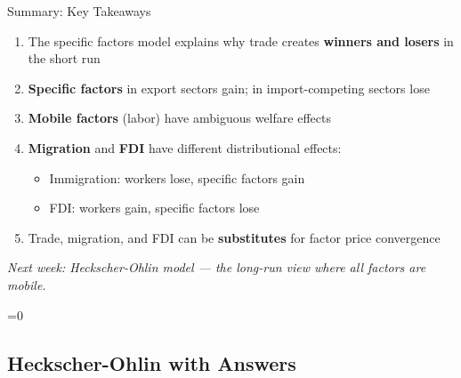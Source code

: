 \documentclass{beamer}
\newcommand{\showanswers}{1}  %
\begin{document}
\begin{frame}{Summary: Key Takeaways}

\begin{enumerate}
    \item The specific factors model explains why trade creates \textbf{winners and losers} in the short run
    
    \vspace{0.2cm}
    
    \item \textbf{Specific factors} in export sectors gain; in import-competing sectors lose
    
    \vspace{0.2cm}
    
    \item \textbf{Mobile factors} (labor) have ambiguous welfare effects
    
    \vspace{0.2cm}
    
    \item \textbf{Migration} and \textbf{FDI} have different distributional effects:
    \begin{itemize}
        \item Immigration: workers lose, specific factors gain
        \item FDI: workers gain, specific factors lose
    \end{itemize}
    
    \vspace{0.2cm}
    
    \item Trade, migration, and FDI can be \textbf{substitutes} for factor price convergence
\end{enumerate}

\vspace{0.3cm}

\textit{Next week: Heckscher-Ohlin model --- the long-run view where all factors are mobile.}

\end{frame}

\fi


\ifnum\showanswers=0
\subsection{Heckscher-Ohlin with Answers}
\end{document}
